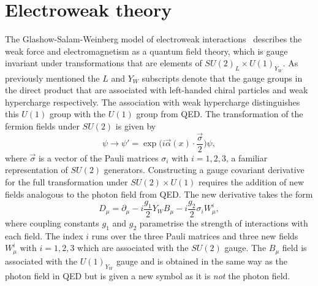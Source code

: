 \section{Electroweak theory}

The Glashow-Salam-Weinberg model of electroweak interactions~\cite{Glashow:1959,
Salam:1968, Weinberg:1967} describes the weak force and electromagnetism as a
quantum field theory, which is gauge invariant under transformations that are
elements of $SU{(2)}_{L} \times U{(1)}_{Y_{W}}$. As previously mentioned the $L$
and $Y_{W}$ subscripts denote that the gauge groups in the direct product that
are associated with left-handed chiral particles and weak hypercharge
respectively. The association with weak hypercharge distinguishes this $U(1)$
group with the $U(1)$ group from QED. The transformation of the fermion fields
under $SU(2)$ is given by
\begin{equation}
  \label{eq:su2-trans} \psi \rightarrow \psi' =
\exp\Big({i\vec{\alpha}(x)\cdot\frac{\vec{\sigma}}{2}}\Big)\psi,
\end{equation} where $\vec{\sigma}$ is a vector of the Pauli matrices
$\sigma_i\text{ with }i=1,2,3$, a familiar representation of $SU(2)$ generators.
Constructing a gauge covariant derivative for the full transformation under
$SU(2) \times U(1)$ requires the addition of new fields analogous to the photon
field from QED. The new derivative takes the form
\begin{equation}
  \label{eq:ew-derivative} D_{\mu} = \partial_{\mu} - i
\frac{g_1}{2}Y_{W}B_{\mu} - i\frac{g_2}{2}\sigma_{i}W_{\mu}^{i},
\end{equation} where coupling constants $g_1$ and $g_2$ parametrise the strength
of interactions with each field. The index $i$ runs over the three Pauli
matrices and three new fields $W^i_{\mu}\text{ with }i=1,2,3$ which are
associated with the $SU(2)$ gauge. The $B_{\mu}$ field is associated with the
$U(1)_{Y_{W}}$ gauge and is obtained in the same way as the photon field in QED
but is given a new symbol as it is \emph{not} the photon field.

